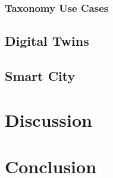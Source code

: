 \subsection{Taxonomy Use Cases}

\section{Digital Twins}

\section{Smart City}



\chapter{Discussion}


\chapter{Conclusion}
